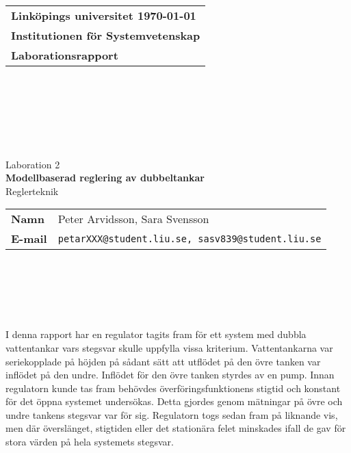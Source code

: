\documentclass[a4wide]{article}
\makeatletter
\def\inst{Systemvetenskap}
\def\typeofdoc{Laborationsrapport}
\def\course{Reglerteknik}
\def\pretitle{Laboration 2}
\def\title{Modellbaserad reglering av dubbeltankar}
\def\name{Peter Arvidsson, Sara Svensson}
\def\email{petarXXX@student.liu.se, sasv839@student.liu.se}
\makeatother
\begin{document}
	\begin{titlepage}
		\thispagestyle{empty}
		\begin{large}
			\begin{tabular}{@{}p{\textwidth}@{}}
				\textbf{Linköpings universitet \hfill \today} \\
				\textbf{Institutionen för \inst} \\
				\textbf{\typeofdoc} \\
			\end{tabular}
		\end{large}
		\vspace{10mm}
		\begin{center}
		~\\
		~\\
		~\\
		~\\
		~\\
		~\\
			\LARGE{\pretitle} \\
			\huge{\textbf{\title}}\\
			\vspace{10mm}
			\LARGE{\course} \\
			\vspace{15mm}
			\begin{large}
				\begin{tabular}{ll}
					\textbf{Namn} & \name \\
					\textbf{E-mail} & \texttt{\email} \\
				\end{tabular}
			\end{large}
			\mbox{\large{\graders}}
		\end{center}
		~\\
		~\\
		~\\
		~\\
		~\\
		I denna rapport har en regulator tagits fram för ett system med dubbla vattentankar vars stegsvar skulle uppfylla vissa kriterium. Vattentankarna var seriekopplade på höjden på sådant sätt att utflödet på den övre tanken var inflödet på den undre. Inflödet för den övre tanken styrdes av en pump. 
		 Innan regulatorn kunde tas fram behövdes överföringsfunktionens stigtid och konstant för det öppna systemet undersökas. Detta gjordes genom mätningar på övre och undre tankens stegsvar var för sig. Regulatorn togs sedan fram på liknande vis, men där överslänget, stigtiden eller det stationära felet minskades ifall de gav för stora värden på hela systemets stegsvar. 
	\end{titlepage}
	
\end{document}
